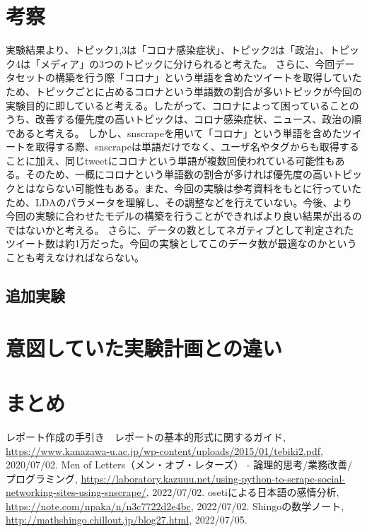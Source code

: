 \documentclass[a4paper, 11pt, titlepage]{jsarticle}
\begin{document}
\section{考察}
実験結果より、トピック1,3は「コロナ感染症状」、トピック2は「政治」、トピック4は「メディア」の3つのトピックに分けられると考えた。
さらに、今回データセットの構築を行う際「コロナ」という単語を含めたツイートを取得していたため、トピックごとに占めるコロナという単語数の割合が多いトピックが今回の実験目的に即していると考える。したがって、コロナによって困っていることのうち、改善する優先度の高いトピックは、コロナ感染症状、ニュース、政治の順であると考える。
しかし、snscrapeを用いて「コロナ」という単語を含めたツイートを取得する際、snscrapeは単語だけでなく、ユーザ名やタグからも取得することに加え、同じtweetにコロナという単語が複数回使われている可能性もある。そのため、一概にコロナという単語数の割合が多ければ優先度の高いトピックとはならない可能性もある。また、今回の実験は参考資料をもとに行っていたため、LDAのパラメータを理解し、その調整などを行えていない。今後、より今回の実験に合わせたモデルの構築を行うことができればより良い結果が出るのではないかと考える。
さらに、データの数としてネガティブとして判定されたツイート数は約1万だった。今回の実験としてこのデータ数が最適なのかということも考えなければならない。

\subsection{追加実験}

\section{意図していた実験計画との違い}


\section{まとめ}


\begin{thebibliography}{n}
  レポート作成の手引き　レポートの基本的形式に関するガイド, \url{https://www.kanazawa-u.ac.jp/wp-content/uploads/2015/01/tebiki2.pdf}, 2020/07/02.
   Men of Letters（メン・オブ・レターズ） - 論理的思考/業務改善/プログラミング, \url{https://laboratory.kazuuu.net/using-python-to-scrape-social-networking-sites-using-snscrape/}, 2022/07/02.
    osetiによる日本語の感情分析, \url{https://note.com/npaka/n/n3c7722d2e4bc}, 2022/07/02.
Shingoの数学ノート, \url{http://mathshingo.chillout.jp/blog27.html}, 2022/07/05.
      

\end{thebibliography}
\end{document}
